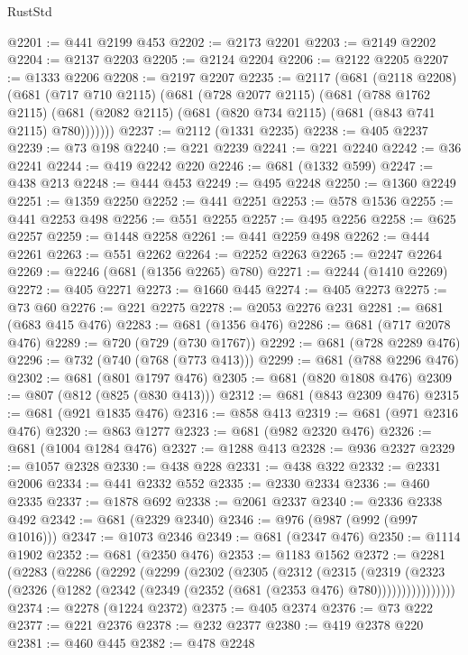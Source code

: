 \begin{lexlean}{RustStd}
\begin{coremodule}
@2201 := @441 @2199 @453
@2202 := @2173 @2201
@2203 := @2149 @2202
@2204 := @2137 @2203
@2205 := @2124 @2204
@2206 := @2122 @2205
@2207 := @1333 @2206
@2208 := @2197 @2207
@2235 := @2117
    (@681
      (@2118 @2208)
      (@681
        (@717 @710 @2115)
        (@681
          (@728 @2077 @2115)
          (@681
            (@788 @1762 @2115)
            (@681 (@2082 @2115) (@681 (@820 @734 @2115) (@681 (@843 @741 @2115) @780)))))))
@2237 := @2112 (@1331 @2235)
@2238 := @405 @2237
@2239 := @73 @198
@2240 := @221 @2239
@2241 := @221 @2240
@2242 := @36 @2241
@2244 := @419 @2242 @220
@2246 := @681 (@1332 @599)
@2247 := @438 @213
@2248 := @444 @453
@2249 := @495 @2248
@2250 := @1360 @2249
@2251 := @1359 @2250
@2252 := @441 @2251
@2253 := @578 @1536
@2255 := @441 @2253 @498
@2256 := @551 @2255
@2257 := @495 @2256
@2258 := @625 @2257
@2259 := @1448 @2258
@2261 := @441 @2259 @498
@2262 := @444 @2261
@2263 := @551 @2262
@2264 := @2252 @2263
@2265 := @2247 @2264
@2269 := @2246 (@681 (@1356 @2265) @780)
@2271 := @2244 (@1410 @2269)
@2272 := @405 @2271
@2273 := @1660 @445
@2274 := @405 @2273
@2275 := @73 @60
@2276 := @221 @2275
@2278 := @2053 @2276 @231
@2281 := @681 (@683 @415 @476)
@2283 := @681 (@1356 @476)
@2286 := @681 (@717 @2078 @476)
@2289 := @720 (@729 (@730 @1767))
@2292 := @681 (@728 @2289 @476)
@2296 := @732 (@740 (@768 (@773 @413)))
@2299 := @681 (@788 @2296 @476)
@2302 := @681 (@801 @1797 @476)
@2305 := @681 (@820 @1808 @476)
@2309 := @807 (@812 (@825 (@830 @413)))
@2312 := @681 (@843 @2309 @476)
@2315 := @681 (@921 @1835 @476)
@2316 := @858 @413
@2319 := @681 (@971 @2316 @476)
@2320 := @863 @1277
@2323 := @681 (@982 @2320 @476)
@2326 := @681 (@1004 @1284 @476)
@2327 := @1288 @413
@2328 := @936 @2327
@2329 := @1057 @2328
@2330 := @438 @228
@2331 := @438 @322
@2332 := @2331 @2006
@2334 := @441 @2332 @552
@2335 := @2330 @2334
@2336 := @460 @2335
@2337 := @1878 @692
@2338 := @2061 @2337
@2340 := @2336 @2338 @492
@2342 := @681 (@2329 @2340)
@2346 := @976 (@987 (@992 (@997 @1016)))
@2347 := @1073 @2346
@2349 := @681 (@2347 @476)
@2350 := @1114 @1902
@2352 := @681 (@2350 @476)
@2353 := @1183 @1562
@2372 := @2281
    (@2283
      (@2286
        (@2292
          (@2299
            (@2302
              (@2305
                (@2312
                  (@2315
                    (@2319
                      (@2323
                        (@2326 (@1282 (@2342 (@2349 (@2352 (@681 (@2353 @476) @780))))))))))))))))
@2374 := @2278 (@1224 @2372)
@2375 := @405 @2374
@2376 := @73 @222
@2377 := @221 @2376
@2378 := @232 @2377
@2380 := @419 @2378 @220
@2381 := @460 @445
@2382 := @478 @2248

\end{coremodule}
\end{lexlean}
